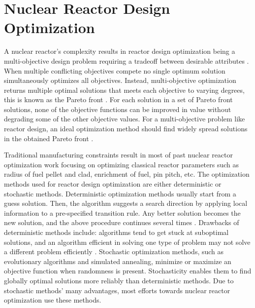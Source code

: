 


\section{Nuclear Reactor Design Optimization}
\label{sec:opt}
A nuclear reactor's complexity results in reactor design optimization being a 
multi-objective design problem requiring a tradeoff between desirable 
attributes \cite{byrne_evolving_2014,simon_sciences_2019}. 
When multiple conflicting objectives compete no single optimum solution 
simultaneously optimizes all objectives. 
Instead, multi-objective optimization returns multiple optimal 
solutions that meets each objective to varying degrees, this is known as the 
Pareto front \cite{deb_multi-objective_2001}. 
For each solution in a set of Pareto front solutions, none of 
the objective functions can be improved in value without degrading some of the 
other objective values. 
For a multi-objective problem like reactor design, an ideal optimization method 
should find widely spread solutions in the obtained Pareto front 
\cite{deb_multi-objective_2001}. 

Traditional manufacturing constraints result in most of past nuclear reactor 
optimization work focusing on optimizing classical reactor 
parameters such as radius of fuel pellet and clad, enrichment of fuel, 
pin pitch, etc. 
The optimization methods used for reactor design optimization are either 
deterministic or stochastic methods. 
Deterministic optimization methods usually start from a guess solution.
Then, the algorithm suggests a search direction by applying local 
information to a pre-specified transition rule. 
Any better solution becomes the new solution, and the above procedure continues 
several times \cite{deb_multi-objective_2001}. 
Drawbacks of deterministic methods include: algorithms tend to get stuck at
suboptimal solutions, and an algorithm efficient in solving one type of problem 
may not solve a different problem efficiently \cite{deb_multi-objective_2001}. 
Stochastic optimization methods, such as evolutionary algorithms and simulated annealing,  
minimize or maximize an objective function when randomness is present. 
Stochasticity enables them to find globally optimal solutions more reliably than 
deterministic methods. 
Due to stochastic methods' many advantages, most efforts towards nuclear 
reactor optimization use these methods. 

